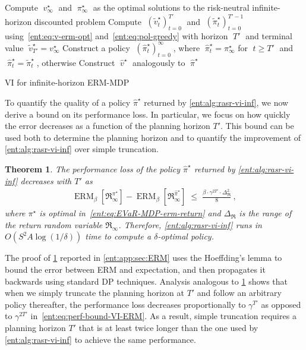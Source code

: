 \documentclass[twoside]{article}
\newcommand{\opt}{^\star}
\newcommand{\vspan}{\Delta_{\mathfrak{R}}}
\newcommand{\erm}[2]{\operatorname{ERM}_{#1}\left[#2\right]}
\theoremstyle{plain}
\newtheorem{theorem}{Theorem}[section]
\theoremstyle{definition}
\theoremstyle{remark}
\begin{document}
\begin{algorithm}
    \KwOut{policy $\;\hat\pi\opt = (\hat\pi_t\opt)_{t=0}^\infty\;$ and value function $\;\hat{v}\opt = (\hat{v}_t\opt)_{t=0}^\infty$}
    Compute $\;v_{\infty}\opt\;$ and $\;\pi_{\infty}\opt \;$ as the optimal solutions to the risk-neutral infinite-horizon discounted problem \;
    Compute $\;(\tilde{v}\opt_t)_{t=0}^{T'}\;$ and $\;(\tilde{\pi}\opt_t)_{t=0}^{T'-1}\;$ using~\eqref{ent:eq:v-erm-opt} and~\eqref{ent:eq:pol-greedy} with horizon $\;T'\;$ and terminal value $\;\tilde{v}\opt_{T'} = v_{\infty}\opt$ \;
    Construct a policy $\;(\hat{\pi}\opt_{t})_{t=0}^{\infty}\;$, where $\;\hat{\pi}\opt_t = \pi_{\infty}\opt$ for $\;t \ge T'\;$  and $\;\hat{\pi}\opt_t = \tilde{\pi}\opt_t\;$, otherwise \;
    Construct $\;\hat{v}\opt\;$ analogously to $\;\hat{\pi}\opt$\;
\Return{$\;\hat\pi\opt\;$, $\;\hat{v}\opt$}
  \caption{VI for infinite-horizon ERM-MDP} \label{ent:alg:rasr-vi-inf}
\end{algorithm}

To quantify the quality of a policy $\hat\pi\opt$ returned by \cref{ent:alg:rasr-vi-inf}, we now derive a bound on its performance loss. In particular, we focus on how quickly the error decreases as a function of the planning horizon $T'$. This bound can be used both to determine the planning horizon and to quantify the improvement of \cref{ent:alg:rasr-vi-inf} over simple truncation. 

\begin{theorem}\label{ent:thm:approx-error}
The performance loss of the policy $\hat{\pi}\opt$ returned by \cref{ent:alg:rasr-vi-inf} decreases with $T'$ as
%
\begin{align}
\label{ent:eq:perf-bound-VI-ERM}
\erm{\beta} { \mathfrak{R}_{\infty}^{\pi\opt}  } - 
\erm{\beta} { \mathfrak{R}_{\infty}^{\hat{\pi}\opt} }
  \;\le\;
  \frac{\beta\cdot \gamma^{2 T'} \!\cdot \Delta_\mathfrak{R}^2}{8}~,
\end{align}
%
where $\pi\opt$ is optimal in~\eqref{ent:eq:EVaR-MDP-erm-return} and $\vspan$ is the range of the return random variable $\mathfrak{R}_{\infty}$. Therefore, \cref{ent:alg:rasr-vi-inf} runs in $O(S^2 A \log(1/\delta))$ time to compute a $\delta$-optimal policy.
\end{theorem}

The proof of \cref{ent:thm:approx-error} reported in \cref{ent:app:sec:ERM} uses the Hoeffding's lemma to bound the error between ERM and expectation, and then propagates it backwards using standard DP techniques. Analysis analogous to \cref{ent:thm:approx-error} shows that when we simply truncate the planning horizon at $T'$ and follow an arbitrary policy thereafter, the performance loss decreases proportionally to $\gamma^{T'}$ as opposed to $\gamma^{2 T'}$ in~\eqref{ent:eq:perf-bound-VI-ERM}. As a result, simple truncation requires a planning horizon $T'$ that is at least twice longer than the one used by \cref{ent:alg:rasr-vi-inf} to achieve the same performance.
\end{document}
